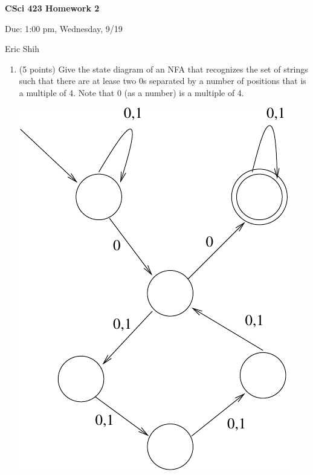 \documentclass[11pt]{article}
\begin{document}
\begin{LARGE}
\centerline {\bf CSci 423 Homework 2}
\end{LARGE}
\vskip 0.25cm

\centerline{Due: 1:00 pm, Wednesday, 9/19}
\centerline{Eric Shih}

\begin{enumerate}

  \item (5 points) Give the state diagram of an NFA that recognizes the set of strings such that there are at lease 
  two 0s separated by a number of positions that is a multiple of 4. Note that 0 (as a number) is a multiple of 4.
  \begin{center}
    \includegraphics[scale=.4] {fig1.pdf}
  \end{center}
  

\end{enumerate}
\end{document}
